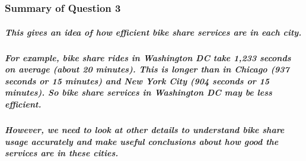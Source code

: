 \documentclass[11pt]{article}
\begin{document}
    \begin{center}
    \end{center}
    { \hspace*{\fill} \\}
    
    \begin{center}
    \end{center}
    { \hspace*{\fill} \\}
    
    \hypertarget{summary-of-question-3}{%
\subsubsection{Summary of Question 3}\label{summary-of-question-3}}

\hypertarget{this-gives-an-idea-of-how-efficient-bike-share-services-are-in-each-city.}{%
\subparagraph{This gives an idea of how efficient bike share services
are in each
city.}\label{this-gives-an-idea-of-how-efficient-bike-share-services-are-in-each-city.}}

\hypertarget{for-example-bike-share-rides-in-washington-dc-take-1233-seconds-on-average-about-20-minutes.-this-is-longer-than-in-chicago-937-seconds-or-15-minutes-and-new-york-city-904-seconds-or-15-minutes.-so-bike-share-services-in-washington-dc-may-be-less-efficient.}{%
\subparagraph{For example, bike share rides in Washington DC take 1,233
seconds on average (about 20 minutes). This is longer than in Chicago
(937 seconds or 15 minutes) and New York City (904 seconds or 15
minutes). So bike share services in Washington DC may be less
efficient.}\label{for-example-bike-share-rides-in-washington-dc-take-1233-seconds-on-average-about-20-minutes.-this-is-longer-than-in-chicago-937-seconds-or-15-minutes-and-new-york-city-904-seconds-or-15-minutes.-so-bike-share-services-in-washington-dc-may-be-less-efficient.}}

\hypertarget{however-we-need-to-look-at-other-details-to-understand-bike-share-usage-accurately-and-make-useful-conclusions-about-how-good-the-services-are-in-these-cities.}{%
\subparagraph{However, we need to look at other details to understand
bike share usage accurately and make useful conclusions about how good
the services are in these
cities.}\label{however-we-need-to-look-at-other-details-to-understand-bike-share-usage-accurately-and-make-useful-conclusions-about-how-good-the-services-are-in-these-cities.}}
\end{document}

